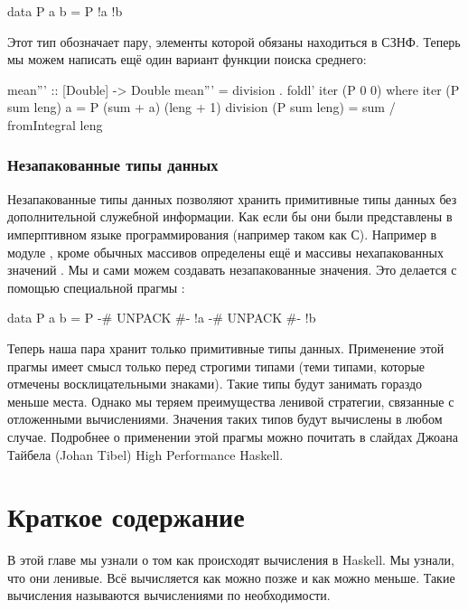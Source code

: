 \begin{code}
data P a b = P !a !b
\end{code}

Этот тип обозначает пару, элементы которой обязаны находиться
в СЗНФ. Теперь мы можем написать ещё один вариант функции
поиска среднего:

\begin{code}
mean''' :: [Double] -> Double
mean''' = division . foldl' iter (P 0 0)
    where iter (P sum leng) a = P (sum  + a) (leng + 1)
          division (P sum leng) = sum / fromIntegral leng
\end{code}

\subsubsection{Незапакованные типы данных}

Незапакованные типы данных позволяют хранить примитивные
типы данных без дополнительной служебной информации.
Как если бы они были представлены в имперптивном языке 
программирования (например таком как С). Например в
модуле , кроме обычных массивов  
определены ещё и массивы нехапакованных значений .
Мы и сами можем создавать незапакованные значения. 
Это делается с помощью специальной прагмы :

\begin{code}
data P a b = P {-# UNPACK #-} !a 
               {-# UNPACK #-} !b
\end{code}

Теперь наша пара хранит только примитивные типы данных.
Применение этой прагмы имеет смысл только перед строгими типами
(теми типами, которые отмечены восклицательными знаками).
Такие типы будут занимать гораздо меньше места. Однако
мы теряем преимущества ленивой стратегии, связанные с 
отложенными вычислениями. Значения таких типов
будут вычислены в любом случае. Подробнее о применении
этой прагмы можно почитать в слайдах Джоана Тайбела (Johan Tibel) 
High Performance Haskell.


\section{Краткое содержание}

В этой главе мы узнали о том как происходят вычисления
в Haskell. Мы узнали, что они ленивые. Всё вычисляется
как можно позже и как можно меньше. Такие вычисления
называются вычислениями по необходимости.

